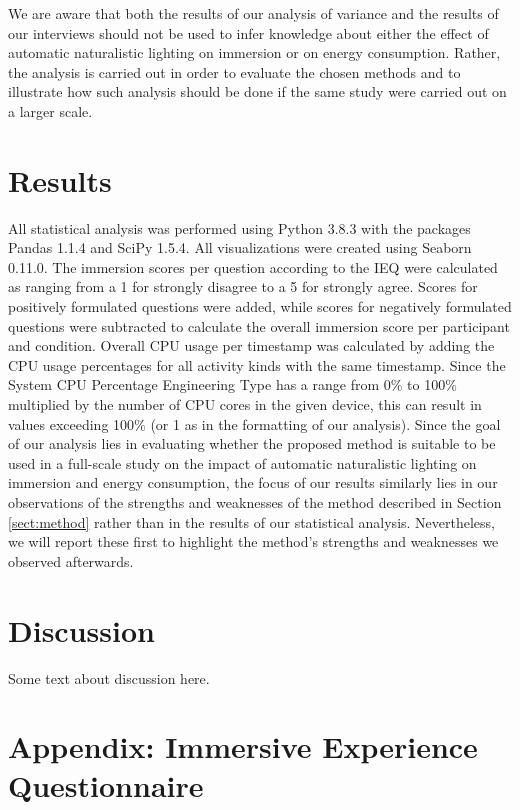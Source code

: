 \documentclass[12pt,twoside,english]{article}
\begin{document}
We are aware that both the results of our analysis of variance and the results of our interviews should not be used to infer knowledge about either the effect of automatic naturalistic lighting on immersion or on energy consumption.
Rather, the analysis is carried out in order to evaluate the chosen methods and to illustrate how such analysis should be done if the same study were carried out on a larger scale.


\section{Results}
\label{sect:results}

All statistical analysis was performed using Python 3.8.3 with the packages Pandas 1.1.4 and SciPy 1.5.4.
All visualizations were created using Seaborn 0.11.0.
The immersion scores per question according to the \gls{IEQ} were calculated as ranging from a 1 for strongly disagree to a 5 for strongly agree.
Scores for positively formulated questions were added, while scores for negatively formulated questions were subtracted to calculate the overall immersion score per participant and condition.
Overall \gls{CPU} usage per timestamp was calculated by adding the \gls{CPU} usage percentages for all activity kinds with the same timestamp.
Since the System CPU Percentage Engineering Type \cite{apple_system_2020} has a range from 0\% to 100\% multiplied by the number of \gls{CPU} cores in the given device, this can result in values exceeding 100\% (or 1 as in the formatting of our analysis).
Since the goal of our analysis lies in evaluating whether the proposed method is suitable to be used in a full-scale study on the impact of automatic naturalistic lighting on immersion and energy consumption, the focus of our results similarly lies in our observations of the strengths and weaknesses of the method described in Section \ref{sect:method} rather than in the results of our statistical analysis.
Nevertheless, we will report these first to highlight the method's strengths and weaknesses we observed afterwards.



\section{Discussion}
\label{sect:discussion}

Some text about discussion here.




% 


\appendix
\section{Appendix: Immersive Experience Questionnaire}
\label{sect:appendix}
\label{sect:ieq}


\clearpage
\end{document}
